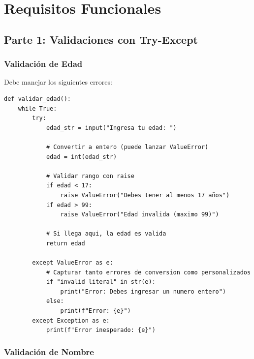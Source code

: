 \documentclass[12pt,a4paper]{article}
\begin{document}
\section{Requisitos Funcionales}

\subsection{Parte 1: Validaciones con Try-Except}

\subsubsection{Validación de Edad}

Debe manejar los siguientes errores:

\begin{lstlisting}[caption=Validación robusta de edad]
def validar_edad():
    while True:
        try:
            edad_str = input("Ingresa tu edad: ")
            
            # Convertir a entero (puede lanzar ValueError)
            edad = int(edad_str)
            
            # Validar rango con raise
            if edad < 17:
                raise ValueError("Debes tener al menos 17 años")
            if edad > 99:
                raise ValueError("Edad invalida (maximo 99)")
            
            # Si llega aqui, la edad es valida
            return edad
            
        except ValueError as e:
            # Capturar tanto errores de conversion como personalizados
            if "invalid literal" in str(e):
                print("Error: Debes ingresar un numero entero")
            else:
                print(f"Error: {e}")
        except Exception as e:
            print(f"Error inesperado: {e}")
\end{lstlisting}

\subsubsection{Validación de Nombre}
\end{document}
